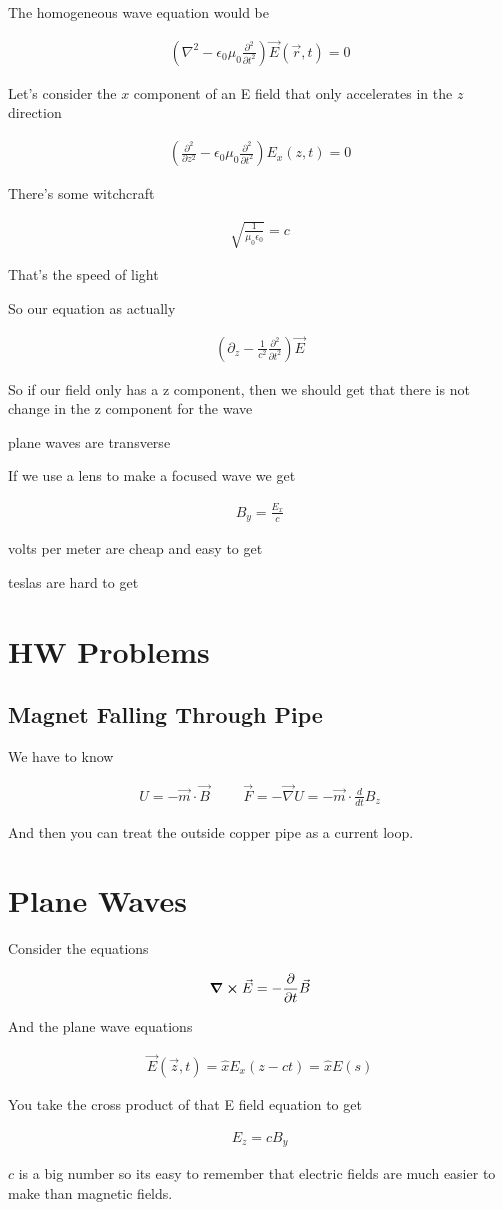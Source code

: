 \documentclass[fleqn]{report}
\newcommand{\hp}{\hspace{1cm}}
\newcommand{\del}{\partial}
\newcommand{\equations} [1] {
\begin{gather*}
#1
\end{gather*}
}
\begin{document}
The homogeneous wave equation would be 
\equations{
    \left(\nabla^2 - \epsilon_0 \mu_0 \frac{\del^2}{\del t^2} \right)
    \vec E(\vec r, t)
    =
    0
}

Let's consider the $x$ component of an E field that only accelerates 
in the $z$ direction 

\equations{
    \left(\frac{\del^2}{\del z^2} 
    - 
    \epsilon_0 \mu_0 \frac{\del^2}{\del t^2} \right)
    E_x(z, t)
    =
    0
}

There's some witchcraft 
\equations{
    \sqrt{\frac{1}{\mu_0 \epsilon_0}} = c
}
That's the speed of light 

So our equation as actually 
\equations{
    \left(
        \del_z 
        - 
        \frac{1}{c^2}
        \frac{\del^2}{\del t^2}
    \right)
    \vec E 
}

So if our field only has a z component, then we should get that 
there is not change in the z component for the wave

plane waves are transverse 
    
If we use a lens to make a focused wave we get 
\equations{
    B_y 
    =
    \frac{E_x}{c}
}

volts per meter are cheap and easy to get 

teslas are hard to get 

\section{HW Problems}

\subsection{Magnet Falling Through Pipe}
We have to know 
\equations{
    U = - \vec m \cdot \vec B 
    \hp 
    \vec F 
    =
    - \vec \nabla U 
    =
    - \vec m 
    \cdot 
    \frac{d}{dt} B_z
}

And then you can treat the outside copper pipe as a current loop. 

\section{Plane Waves}
Consider the equations 
\equations{
    \curl \vec E = -\frac{\del}{\del t} \vec B 
}

And the plane wave equations
\equations{
    \vec E(\vec z, t) 
    = 
    \hat x E_x(z - ct) 
    =
    \hat x E(s)
}

You take the cross product of that E field equation to get 
\equations{
    E_z 
    =
    c B_y
}
$c$ is a big number so its easy to remember that electric fields are 
much easier to make than magnetic fields. 
\end{document}
